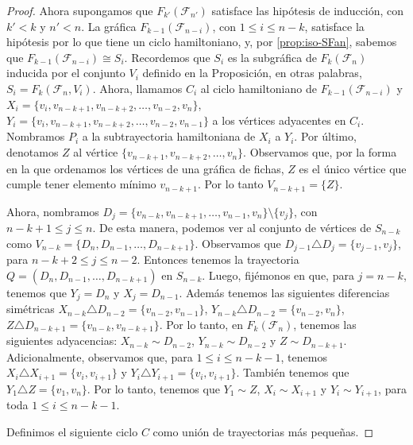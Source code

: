 \begin{proof}
    Ahora supongamos que $F_{k'}(\mathcal{F}_{n'})$ satisface las hip\'otesis de
    inducci\'on, con $k'< k$ y $n'<n$. La gr\'afica
    $F_{k-1}(\mathcal{F}_{n-i})$, con $1 \leq i \leq n-k$, satisface la
    hip\'otesis por lo que tiene un ciclo hamiltoniano, y, por
    \cref{prop:iso-SFan}, sabemos que $F_{k-1}(\mathcal{F}_{n-i}) \cong S_i$.
    Recordemos que  $S_i$ es la subgr\'afica de $F_k(\mathcal{F}_n)$ inducida
    por el conjunto $V_i$ definido en la Proposici\'on, en otras palabras, $S_i=
    F_k(\mathcal{F}_n, V_i)$. Ahora, llamamos $C_i$ al ciclo hamiltoniano de
    $F_{k-1}(\mathcal{F}_{n-i})$ y $X_i = \{v_i, v_{n-k+1}, v_{n-k+2}, \dots,
    v_{n-2}, v_n\}$, $Y_i= \{v_i, v_{n-k+1}, v_{n-k+2}, \dots, v_{n-2},
    v_{n-1}\}$ a los v\'ertices adyacentes en $C_i$. Nombramos $P_i$ a la
    subtrayectoria hamiltoniana de $X_i$ a $Y_i$. Por \'ultimo, denotamos $Z$ al
    v\'ertice $\{v_{n-k+1}, v_{n-k+2}, \dots, v_n\}$. Observamos que, por la
    forma en la que ordenamos los v\'ertices de una gr\'afica de fichas, $Z$ es
    el \'unico v\'ertice que cumple tener elemento m\'inimo $v_{n-k+1}$. Por lo
    tanto  $V_{n-k+1} = \{Z\}$. 
    
    Ahora, nombramos $D_j =\{v_{n-k}, v_{n-k+1}, \dots, v_{n-1}, v_n\} \setminus
    \{v_j\}$, con $n-k+1 \leq j \leq n$.  De esta manera, podemos ver al
    conjunto de v\'ertices de $S_{n-k}$ como $V_{n-k}=\{D_n, D_{n-1}, \dots,
    D_{n-k+1}\}$. Observamos que $D_{j-1} \triangle D_j= \{v_{j-1}, v_j\}$, para
    $n-k+2 \leq j \leq n-2$. Entonces tenemos la trayectoria $Q= (D_n, D_{n-1},
    \dots, D_{n-k+1})$ en $S_{n-k}$.     
    Luego, fij\'emonos en que, para $j= n-k$, tenemos que $Y_j = D_n$ y $X_j=
    D_{n-1}$. Adem\'as tenemos las siguientes diferencias sim\'etricas
    $X_{n-k}\triangle D_{n-2} =\{v_{n-2}, v_{n-1}\}$, $Y_{n-k}\triangle D_{n-2}
    =\{v_{n-2}, v_n\}$, $Z\triangle D_{n-k+1} =\{v_{n-k}, v_{n-k+1}\}$. Por lo
    tanto, en $F_k(\mathcal{F}_n)$, tenemos las siguientes adyacencias: $X_{n-k}
    \sim D_{n-2}$, $Y_{n-k} \sim D_{n-2}$ y $Z \sim D_{n-k+1}$. Adicionalmente,
    observamos que, para $1 \leq i \leq n- k- 1$, tenemos $X_{i} \triangle
    X_{i+1}= \{v_i, v_{i+1}\}$ y $Y_i \triangle Y_{i+1} = \{v_i, v_{i+1}\}$.
    Tambi\'en tenemos que $Y_1 \triangle Z = \{v_1, v_n\}$. Por lo tanto, tenemos
    que $Y_1 \sim Z$, $X_i \sim X_{i+1}$ y $Y_i \sim Y_{i+1}$, para toda $1 \leq
    i \leq n-k-1$.
            
    Definimos el siguiente ciclo $C$ como uni\'on de trayectorias m\'as
    peque\~{n}as.
    

\end{proof}
